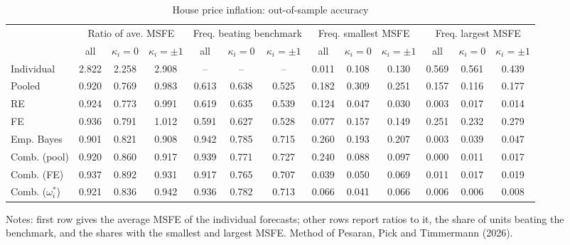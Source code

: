 \begin{table}[htbp]\centering\footnotesize
\caption{House price inflation: out-of-sample accuracy}
\begin{tabular}{lcccccccccccc}
\toprule
 & \multicolumn{3}{c}{Ratio of ave. MSFE} & \multicolumn{3}{c}{Freq. beating benchmark} & \multicolumn{3}{c}{Freq. smallest MSFE} & \multicolumn{3}{c}{Freq. largest MSFE} \\
\cmidrule(lr){2-4}\cmidrule(lr){5-7}\cmidrule(lr){8-10}\cmidrule(lr){11-13}
 & all & $\kappa_i=0$ & $\kappa_i=\pm1$ & all & $\kappa_i=0$ & $\kappa_i=\pm1$ & all & $\kappa_i=0$ & $\kappa_i=\pm1$ & all & $\kappa_i=0$ & $\kappa_i=\pm1$ \\
\midrule
Individual & 2.822 & 2.258 & 2.908 & -- & -- & -- & 0.011 & 0.108 & 0.130 & 0.569 & 0.561 & 0.439 \\
Pooled & 0.920 & 0.769 & 0.983 & 0.613 & 0.638 & 0.525 & 0.182 & 0.309 & 0.251 & 0.157 & 0.116 & 0.177 \\
RE & 0.924 & 0.773 & 0.991 & 0.619 & 0.635 & 0.539 & 0.124 & 0.047 & 0.030 & 0.003 & 0.017 & 0.014 \\
FE & 0.936 & 0.791 & 1.012 & 0.591 & 0.627 & 0.528 & 0.077 & 0.157 & 0.149 & 0.251 & 0.232 & 0.279 \\
Emp. Bayes & 0.901 & 0.821 & 0.908 & 0.942 & 0.785 & 0.715 & 0.260 & 0.193 & 0.207 & 0.003 & 0.039 & 0.047 \\
Comb. (pool) & 0.920 & 0.860 & 0.917 & 0.939 & 0.771 & 0.727 & 0.240 & 0.088 & 0.097 & 0.000 & 0.011 & 0.017 \\
Comb. (FE) & 0.937 & 0.892 & 0.931 & 0.917 & 0.765 & 0.707 & 0.039 & 0.050 & 0.069 & 0.011 & 0.017 & 0.019 \\
Comb. ($\omega_i^*$) & 0.921 & 0.836 & 0.942 & 0.936 & 0.782 & 0.713 & 0.066 & 0.041 & 0.066 & 0.006 & 0.006 & 0.008 \\
\bottomrule
\end{tabular}
\par\smallskip\parbox{\linewidth}{\scriptsize Notes: first row gives the average MSFE of the individual forecasts; other rows report ratios to it, the share of units beating the benchmark, and the shares with the smallest and largest MSFE. Method of Pesaran, Pick and Timmermann (2026).}
\end{table}